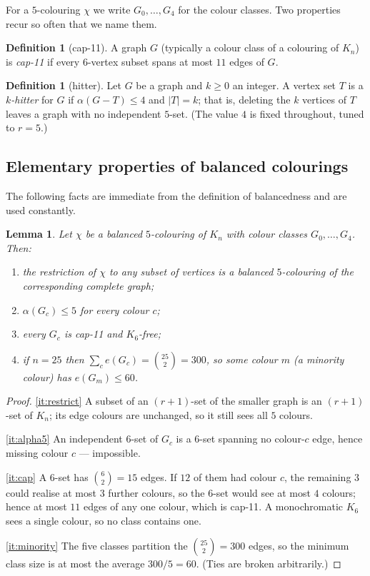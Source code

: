\documentclass[11pt,reqno]{amsart}
\newtheorem{lemma}[theorem]{Lemma}
\theoremstyle{definition}
\newtheorem{definition}[theorem]{Definition}
\theoremstyle{remark}
\newcommand{\abs}[1]{\left|#1\right|}
\newcommand{\capeleven}{\textsf{cap-11}}
\begin{document}
For a $5$-colouring $\chi$ we write $G_0,\dots,G_4$ for the colour classes. Two
properties recur so often that we name them.

\begin{definition}[\capeleven]
A graph $G$ (typically a colour class of a colouring of $K_n$) is \emph{\capeleven}
if every $6$-vertex subset spans at most $11$ edges of $G$.
\end{definition}

\begin{definition}[hitter]
Let $G$ be a graph and $k\ge 0$ an integer. A vertex set $T$ is a \emph{$k$-hitter}
for $G$ if $\alpha(G-T)\le 4$ and $\abs{T}=k$; that is, deleting the $k$ vertices
of $T$ leaves a graph with no independent $5$-set. (The value $4$ is fixed
throughout, tuned to $r=5$.)
\end{definition}

\subsection{Elementary properties of balanced colourings}
The following facts are immediate from the definition of balancedness and are used
constantly.

\begin{lemma}\label{lem:elem}
Let $\chi$ be a balanced $5$-colouring of $K_n$ with colour classes
$G_0,\dots,G_4$. Then:
\begin{enumerate}[label=\textup{(\alph*)}]
\item\label{it:restrict} the restriction of $\chi$ to any subset of vertices is a
balanced $5$-colouring of the corresponding complete graph;
\item\label{it:alpha5} $\alpha(G_c)\le 5$ for every colour $c$;
\item\label{it:cap} every $G_c$ is \capeleven{} and $K_6$-free;
\item\label{it:minority} if $n=25$ then $\sum_{c}e(G_c)=\binom{25}{2}=300$, so
some colour $m$ (a \emph{minority} colour) has $e(G_m)\le 60$.
\end{enumerate}
\end{lemma}

\begin{proof}
\ref{it:restrict} A subset of an $(r+1)$-set of the smaller graph is an
$(r+1)$-set of $K_n$; its edge colours are unchanged, so it still sees all
$5$ colours.

\ref{it:alpha5} An independent $6$-set of $G_c$ is a $6$-set spanning no colour-$c$
edge, hence missing colour $c$ --- impossible.

\ref{it:cap} A $6$-set has $\binom 62=15$ edges. If $12$ of them had colour $c$,
the remaining $3$ could realise at most $3$ further colours, so the $6$-set would
see at most $4$ colours; hence at most $11$ edges of any one colour, which is
\capeleven. A monochromatic $K_6$ sees a single colour, so no class contains one.

\ref{it:minority} The five classes partition the $\binom{25}{2}=300$ edges, so the
minimum class size is at most the average $300/5=60$. (Ties are broken
arbitrarily.)
\end{proof}
\end{document}
